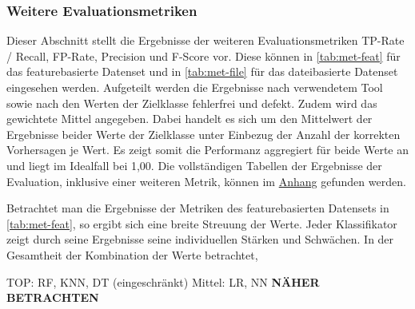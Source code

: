 \subsubsection*{Weitere Evaluationsmetriken}

Dieser Abschnitt stellt die Ergebnisse der weiteren Evaluationsmetriken TP-Rate / Recall, FP-Rate, Precision und F-Score vor. Diese können in \autoref{tab:met-feat} für das featurebasierte Datenset und in \autoref{tab:met-file} für das dateibasierte Datenset eingesehen werden. Aufgeteilt werden die Ergebnisse nach verwendetem Tool sowie nach den Werten der Zielklasse \glqq fehlerfrei\grqq{} und \glqq defekt\grqq. Zudem wird das gewichtete Mittel angegeben. Dabei handelt es sich um den Mittelwert der Ergebnisse beider Werte der Zielklasse unter Einbezug der Anzahl der korrekten Vorhersagen je Wert. Es zeigt somit die Performanz aggregiert für beide Werte an und liegt im Idealfall bei 1,00. Die vollständigen Tabellen der Ergebnisse der Evaluation, inklusive einer weiteren Metrik, können im \hyperref[appendix3]{Anhang} gefunden werden.

Betrachtet man die Ergebnisse der Metriken des featurebasierten Datensets in \autoref{tab:met-feat}, so ergibt sich eine breite Streuung der Werte. Jeder Klassifikator zeigt durch seine Ergebnisse seine individuellen \glqq Stärken\grqq{} und \glqq Schwächen\grqq. In der Gesamtheit der Kombination der Werte betrachtet, 

TOP: RF, KNN, DT (eingeschränkt)
Mittel: LR, NN
\textbf{NÄHER BETRACHTEN}


